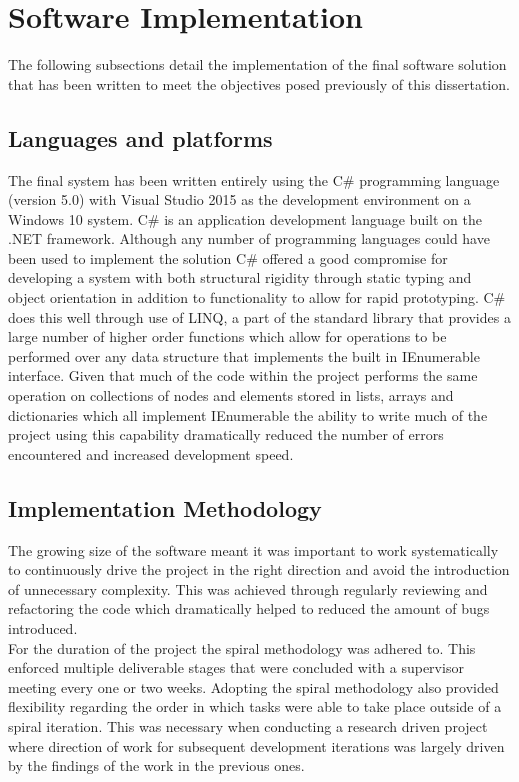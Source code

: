 



\section{Software Implementation}
The following subsections detail the implementation of the final software solution that has been written to meet the objectives posed previously of this dissertation.

\subsection{Languages and platforms}
The final system has been written entirely using the C\# programming language (version 5.0) with Visual Studio 2015 as the development environment on a Windows 10 system. C\# is an application development language built on the .NET framework. Although any number of programming languages could have been used to implement the solution C\# offered a good compromise for developing a system with both structural rigidity through static typing and object orientation in addition to functionality to allow for rapid prototyping. C\# does this well through use of LINQ, a part of the standard library that provides a large number of higher order functions which allow for operations to be performed over any data structure that implements the built in IEnumerable interface. Given that much of the code within the project performs the same operation on collections of nodes and elements stored in lists, arrays and dictionaries which all implement IEnumerable the ability to write much of the project using this capability dramatically reduced the number of errors encountered and increased development speed.


\subsection{Implementation Methodology}
The growing size of the software meant it was important to work systematically to continuously drive the project in the right direction and avoid the introduction of unnecessary complexity. This was achieved through regularly reviewing and refactoring the code which dramatically helped to reduced the amount of bugs introduced. \\

\noindent
For the duration of the project the spiral methodology was adhered to. This enforced multiple deliverable stages that were concluded with a supervisor meeting every one or two weeks. Adopting the spiral methodology also provided flexibility regarding the order in which tasks were able to take place outside of a spiral iteration. This was necessary when conducting a research driven project where direction of work for subsequent development iterations was largely driven by the  findings of the work in the previous ones. \\

